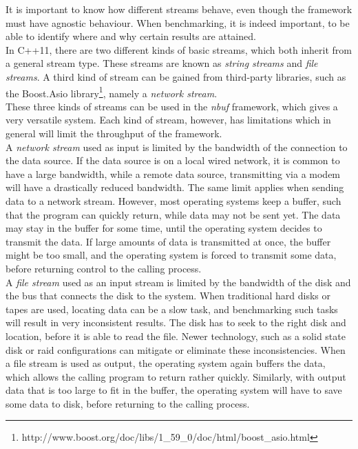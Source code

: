 \documentclass[a4paper]{article}
\newcommand{\nbuf}{\textit{nbuf} }
\begin{document}
It is important to know how different streams behave, even though the framework must have agnostic behaviour. When benchmarking, it is indeed important, to be able to identify where and why certain results are attained.\\

In C++11, there are two different kinds of basic streams, which both inherit from a general stream type. These streams are known as \textit{string streams} and \textit{file streams}. A third kind of stream can be gained from third-party libraries, such as the Boost.Asio library\footnote{ http://www.boost.org/doc/libs/1\_59\_0/doc/html/boost\_asio.html}, namely a \textit{network stream}.\\

These three kinds of streams can be used in the \nbuf framework, which gives a very versatile system. Each kind of stream, however, has limitations which in general will limit the throughput of the framework.\\

A \textit{network stream} used as input is limited by the bandwidth of the connection to the data source. If the data source is on a local wired network, it is common to have a large bandwidth, while a remote data source, transmitting via a modem will have a drastically reduced bandwidth. The same limit applies when sending data to a network stream. However, most operating systems keep a buffer, such that the program can quickly return, while data may not be sent yet. The data may stay in the buffer for some time, until the operating system decides to transmit the data. If large amounts of data is transmitted at once, the buffer might be too small, and the operating system is forced to transmit some data, before returning control to the calling process.\\

A \textit{file stream} used as an input stream is limited by the bandwidth of the disk and the bus that connects the disk to the system. When traditional hard disks or tapes are used, locating data can be a slow task, and benchmarking such tasks will result in very inconsistent results. The disk has to seek to the right disk and location, before it is able to read the file. Newer technology, such as a solid state disk or raid configurations can mitigate or eliminate these inconsistencies. When a file stream is used as output, the operating system again buffers the data, which allows the calling program to return rather quickly. Similarly, with output data that is too large to fit in the buffer, the operating system will have to save some data to disk, before returning to the calling process.\\
\end{document}
